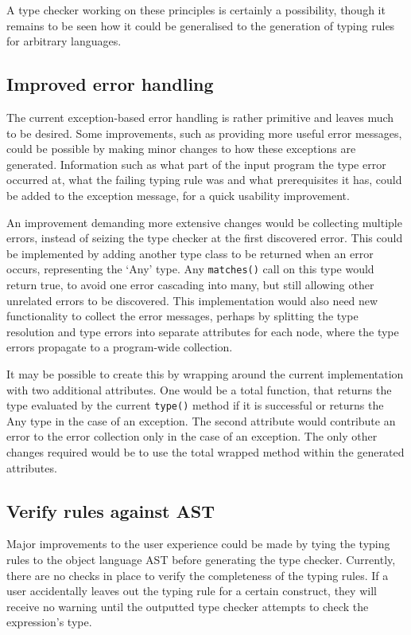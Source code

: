 \documentclass[nofilelist]{cslthse-msc}
\begin{document}

A type checker working on these principles is certainly a possibility, though it remains to be seen how it could be generalised to the generation of typing rules for arbitrary languages.

\subsection{Improved error handling}\label{improvederrorhandling}
The current exception-based error handling is rather primitive and leaves much to be desired.
Some improvements, such as providing more useful error messages, could be possible by making minor changes to how these exceptions are generated.
Information such as what part of the input program the type error occurred at, what the failing typing rule was and what prerequisites it has, could be added to the exception message, for a quick usability improvement.

An improvement demanding more extensive changes would be collecting multiple errors, instead of seizing the type checker at the first discovered error.
This could be implemented by adding another type class to be returned when an error occurs, representing the `Any' type.
Any \lstinline{matches()} call on this type would return true, to avoid one error cascading into many, but still allowing other unrelated errors to be discovered.
This implementation would also need new functionality to collect the error messages, perhaps by splitting the type resolution and type errors into separate attributes for each node, where the type errors propagate to a program-wide collection.

It may be possible to create this by wrapping around the current implementation with two additional attributes.
One would be a total function, that returns the type evaluated by the current \lstinline{type()} method if it is successful or returns the Any type in the case of an exception.
The second attribute would contribute an error to the error collection only in the case of an exception.
The only other changes required would be to use the total wrapped method within the generated attributes.


\subsection{Verify rules against AST}
Major improvements to the user experience could be made by tying the typing rules to the object language AST before generating the type checker.
Currently, there are no checks in place to verify the completeness of the typing rules.
If a user accidentally leaves out the typing rule for a certain construct, they will receive no warning until the outputted type checker attempts to check the expression's type.
\end{document}
